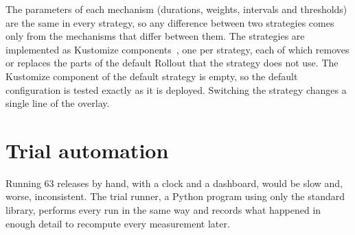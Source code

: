 The parameters of each mechanism (durations, weights, intervals and thresholds) are the same in every strategy, so any difference between two strategies comes only from the mechanisms that differ between them. The strategies are implemented as Kustomize components~\cite{KustomizeComponents}, one per strategy, each of which removes or replaces the parts of the default Rollout that the strategy does not use. The Kustomize component of the default strategy is empty, so the default configuration is tested exactly as it is deployed. Switching the strategy changes a single line of the overlay.

\section{Trial automation}
\label{sec:EvalRunner}
Running 63 releases by hand, with a clock and a dashboard, would be slow and, worse, inconsistent. The trial runner, a Python program using only the standard library, performs every run in the same way and records what happened in enough detail to recompute every measurement later.

